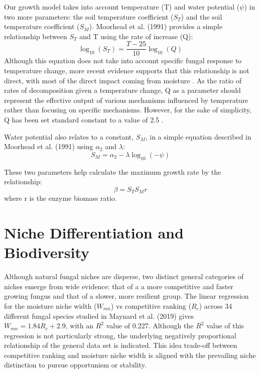 \documentclass{article}
\begin{document}
Our growth model takes into account temperature (T) and water potential ($\psi$) in two more parameters: the soil temperature coefficient ($S_T$) and the soil temperature coefficient ($S_M$). Moorhead et al. (1991) provides a simple relationship between $S_T$ and T using the rate of increase (Q):
\begin{equation}
\log_{10}(S_T) = \frac{T-25}{10}\log_{10}(Q)
\end{equation}
Although this equation does not take into account specific fungal response to temperature change, more recent evidence supports that this relationship is not direct, with most of the direct impact coming from moisture \cite{Petraglia2018}. As the ratio of rates of decomposition given a temperature change, Q as a parameter should represent the effective output of various mechanisms influenced by temperature rather than focusing on specific mechanisms. However, for the sake of simplicity, Q has been set standard constant to a value of 2.5 \cite{Moorhead1991}.

Water potential also relates to a constant, $S_M$, in a simple equation described in Moorhead et al. (1991) using $\alpha_2$ and $\lambda$:
\begin{equation}
S_M = \alpha_2 -\lambda \log_{10}(-\psi)
\end{equation}

These two parameters help calculate the maximum growth rate by the relationship:
\begin{equation}
\beta = S_T S_M r
\end{equation}
where r is the enzyme biomass ratio.

\section{Niche Differentiation and Biodiversity}
Although natural fungal niches are disperse, two distinct general categories of niches emerge from wide evidence: that of a a more competitive and faster growing fungus and that of a slower, more resilient group. The linear regression for the moisture niche width ($W_{mn}$) vs competitive ranking ($R_c$) across 34 different fungal species studied in Maynard et al. (2019) gives $W_{mn}= 1.84R_c + 2.9$, with an $R^2$ value of 0.227. Although the $R^2$ value of this regression is not particularly strong, the underlying negatively proportional relationship of the general data set is indicated. This idea trade-off between competitive ranking and moisture niche width is aligned with the prevailing niche distinction to pursue opportunism or stability. 
\end{document}
